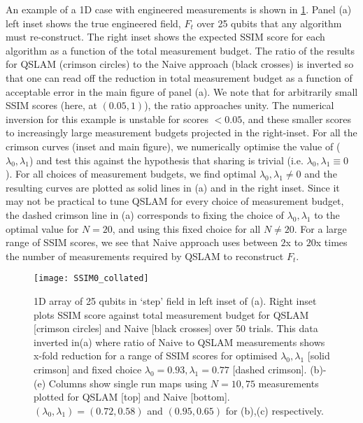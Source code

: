 An example of a 1D case with engineered measurements  is shown in \cref{SSIM0_collated}. Panel (a) left inset shows the true engineered field, $F_t$ over 25 qubits that any algorithm must re-construct. The right inset shows the expected SSIM score  for each algorithm as a function of the total measurement budget. The ratio of the results for QSLAM (crimson circles) to the Naive approach (black crosses) is inverted so that one can read off the reduction in total measurement budget as a function of acceptable error in the main figure of panel (a). We note that for arbitrarily small SSIM scores (here, at $(0.05, 1)$), the ratio approaches unity. The numerical inversion for this example is unstable for scores $< 0.05$, and these smaller scores to increasingly large measurement budgets projected in the right-inset. For all the crimson curves (inset and main figure), we numerically optimise the value of ($\lambda_0, \lambda_1$) and test this against the hypothesis that sharing is trivial (i.e. $\lambda_0, \lambda_1 \equiv 0$ ). For all choices of measurement budgets, we find optimal $\lambda_0, \lambda_1 \neq 0$ and the resulting curves are plotted as solid lines  in (a) and in the right inset. Since it may not be practical to tune QSLAM for every choice of measurement budget, the dashed crimson line in (a) corresponds to fixing the choice of $\lambda_0, \lambda_1$ to the optimal value for $N=20$, and using this fixed choice for all $N \neq 20$. For a large range of SSIM scores, we see that  Naive approach uses between $2$x to $20$x times the number of measurements required by QSLAM to reconstruct $F_t$. 

\begin{figure}
	\texttt{[image: SSIM0\_collated]}
	\caption{\label{SSIM0_collated} 1D array of 25 qubits in `step' field in left inset of (a).  Right inset plots SSIM score against total measurement budget for QSLAM [crimson circles] and Naive [black crosses] over 50 trials. This data inverted in(a) where ratio of Naive to QSLAM measurements shows x-fold reduction for a range of SSIM scores for optimised $\lambda_0, \lambda_1$ [solid crimson] and fixed choice $\lambda_0 = 0.93, \lambda_1 = 0.77$ [dashed crimson]. (b)-(e) Columns show single run maps using $N=10, 75$ measurements plotted for QSLAM [top] and Naive [bottom]. $(\lambda_0, \lambda_1)= (0.72, 0.58)$ and $ (0.95, 0.65)$ for (b),(c) respectively.}    	
\end{figure} 

